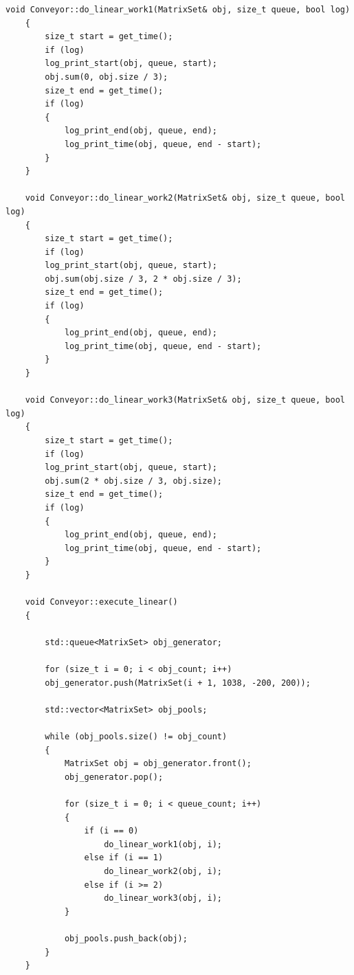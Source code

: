 \documentclass[12pt, a4paper]{report}
\begin{document}
	\begin{lstlisting}[label=code:lin,caption=Реализация линейной обработки матрицы]
	void Conveyor::do_linear_work1(MatrixSet& obj, size_t queue, bool log)
	{
		size_t start = get_time();
		if (log)
		log_print_start(obj, queue, start);
		obj.sum(0, obj.size / 3);
		size_t end = get_time();
		if (log)
		{
			log_print_end(obj, queue, end);
			log_print_time(obj, queue, end - start);
		}
	}
	
	void Conveyor::do_linear_work2(MatrixSet& obj, size_t queue, bool log)
	{
		size_t start = get_time();
		if (log)
		log_print_start(obj, queue, start);
		obj.sum(obj.size / 3, 2 * obj.size / 3);
		size_t end = get_time();
		if (log)
		{
			log_print_end(obj, queue, end);
			log_print_time(obj, queue, end - start);
		}
	}
	
	void Conveyor::do_linear_work3(MatrixSet& obj, size_t queue, bool log)
	{
		size_t start = get_time();
		if (log)
		log_print_start(obj, queue, start);
		obj.sum(2 * obj.size / 3, obj.size);
		size_t end = get_time();
		if (log)
		{
			log_print_end(obj, queue, end);
			log_print_time(obj, queue, end - start);
		}
	}
	
	void Conveyor::execute_linear()
	{
		
		std::queue<MatrixSet> obj_generator;
		
		for (size_t i = 0; i < obj_count; i++)
		obj_generator.push(MatrixSet(i + 1, 1038, -200, 200));
		
		std::vector<MatrixSet> obj_pools;
		
		while (obj_pools.size() != obj_count)
		{
			MatrixSet obj = obj_generator.front();
			obj_generator.pop();
			
			for (size_t i = 0; i < queue_count; i++)
			{
				if (i == 0)
					do_linear_work1(obj, i);
				else if (i == 1)
					do_linear_work2(obj, i);
				else if (i >= 2)
					do_linear_work3(obj, i);
			}
		
			obj_pools.push_back(obj);
		}
	}
	\end{lstlisting}
	
\end{document}
